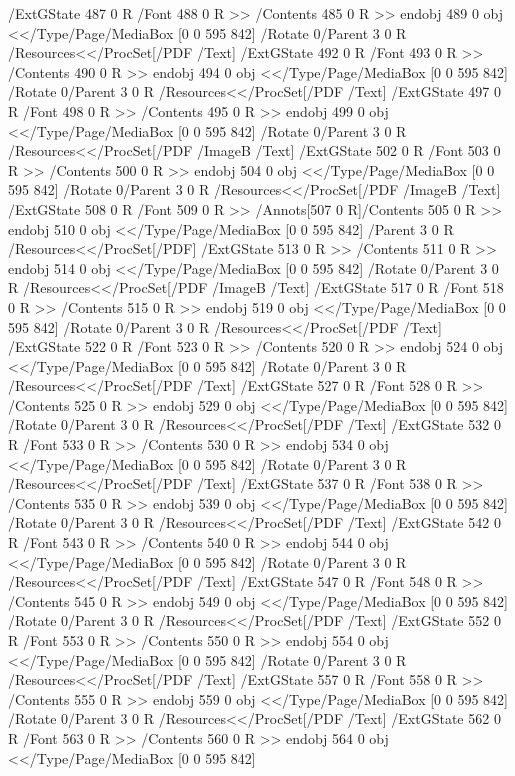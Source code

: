 {{{{{{{{{{{{{{{{{{{{{{{{{{{{/ExtGState 487 0 R
/Font 488 0 R
>>
/Contents 485 0 R
>>
endobj
489 0 obj
<</Type/Page/MediaBox [0 0 595 842]
/Rotate 0/Parent 3 0 R
/Resources<</ProcSet[/PDF /Text]
/ExtGState 492 0 R
/Font 493 0 R
>>
/Contents 490 0 R
>>
endobj
494 0 obj
<</Type/Page/MediaBox [0 0 595 842]
/Rotate 0/Parent 3 0 R
/Resources<</ProcSet[/PDF /Text]
/ExtGState 497 0 R
/Font 498 0 R
>>
/Contents 495 0 R
>>
endobj
499 0 obj
<</Type/Page/MediaBox [0 0 595 842]
/Rotate 0/Parent 3 0 R
/Resources<</ProcSet[/PDF /ImageB /Text]
/ExtGState 502 0 R
/Font 503 0 R
>>
/Contents 500 0 R
>>
endobj
504 0 obj
<</Type/Page/MediaBox [0 0 595 842]
/Rotate 0/Parent 3 0 R
/Resources<</ProcSet[/PDF /ImageB /Text]
/ExtGState 508 0 R
/Font 509 0 R
>>
/Annots[507 0 R]/Contents 505 0 R
>>
endobj
510 0 obj
<</Type/Page/MediaBox [0 0 595 842]
/Parent 3 0 R
/Resources<</ProcSet[/PDF]
/ExtGState 513 0 R
>>
/Contents 511 0 R
>>
endobj
514 0 obj
<</Type/Page/MediaBox [0 0 595 842]
/Rotate 0/Parent 3 0 R
/Resources<</ProcSet[/PDF /ImageB /Text]
/ExtGState 517 0 R
/Font 518 0 R
>>
/Contents 515 0 R
>>
endobj
519 0 obj
<</Type/Page/MediaBox [0 0 595 842]
/Rotate 0/Parent 3 0 R
/Resources<</ProcSet[/PDF /Text]
/ExtGState 522 0 R
/Font 523 0 R
>>
/Contents 520 0 R
>>
endobj
524 0 obj
<</Type/Page/MediaBox [0 0 595 842]
/Rotate 0/Parent 3 0 R
/Resources<</ProcSet[/PDF /Text]
/ExtGState 527 0 R
/Font 528 0 R
>>
/Contents 525 0 R
>>
endobj
529 0 obj
<</Type/Page/MediaBox [0 0 595 842]
/Rotate 0/Parent 3 0 R
/Resources<</ProcSet[/PDF /Text]
/ExtGState 532 0 R
/Font 533 0 R
>>
/Contents 530 0 R
>>
endobj
534 0 obj
<</Type/Page/MediaBox [0 0 595 842]
/Rotate 0/Parent 3 0 R
/Resources<</ProcSet[/PDF /Text]
/ExtGState 537 0 R
/Font 538 0 R
>>
/Contents 535 0 R
>>
endobj
539 0 obj
<</Type/Page/MediaBox [0 0 595 842]
/Rotate 0/Parent 3 0 R
/Resources<</ProcSet[/PDF /Text]
/ExtGState 542 0 R
/Font 543 0 R
>>
/Contents 540 0 R
>>
endobj
544 0 obj
<</Type/Page/MediaBox [0 0 595 842]
/Rotate 0/Parent 3 0 R
/Resources<</ProcSet[/PDF /Text]
/ExtGState 547 0 R
/Font 548 0 R
>>
/Contents 545 0 R
>>
endobj
549 0 obj
<</Type/Page/MediaBox [0 0 595 842]
/Rotate 0/Parent 3 0 R
/Resources<</ProcSet[/PDF /Text]
/ExtGState 552 0 R
/Font 553 0 R
>>
/Contents 550 0 R
>>
endobj
554 0 obj
<</Type/Page/MediaBox [0 0 595 842]
/Rotate 0/Parent 3 0 R
/Resources<</ProcSet[/PDF /Text]
/ExtGState 557 0 R
/Font 558 0 R
>>
/Contents 555 0 R
>>
endobj
559 0 obj
<</Type/Page/MediaBox [0 0 595 842]
/Rotate 0/Parent 3 0 R
/Resources<</ProcSet[/PDF /Text]
/ExtGState 562 0 R
/Font 563 0 R
>>
/Contents 560 0 R
>>
endobj
564 0 obj
<</Type/Page/MediaBox [0 0 595 842]
}}}}}}}}}}}}}}}}}}}}}}}}}}}}
